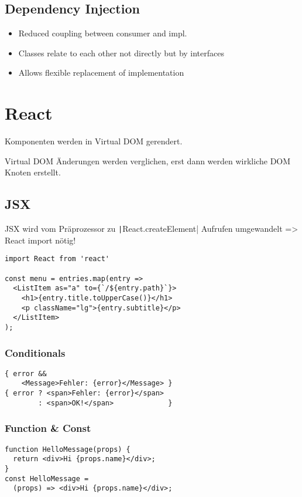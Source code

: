 \begin{multicols*}{4}
\subsection{Dependency Injection}
\begin{itemize}
    \item Reduced coupling between consumer and impl.
    \item Classes relate to each other not directly but by interfaces
    \item Allows flexible replacement of implementation
\end{itemize}

\section{React}

Komponenten werden in Virtual DOM gerendert.

Virtual DOM Änderungen werden verglichen, erst dann werden wirkliche DOM Knoten erstellt.

\subsection{JSX}
JSX wird vom Präprozessor zu \texttt|React.createElement| Aufrufen umgewandelt => React import nötig!
\begin{verbatim}
import React from 'react'

const menu = entries.map(entry =>
  <ListItem as="a" to={`/${entry.path}`}>
    <h1>{entry.title.toUpperCase()}</h1>
    <p className="lg">{entry.subtitle}</p>
  </ListItem>
);
\end{verbatim}

\subsubsection{Conditionals}
\begin{verbatim}
{ error &&
    <Message>Fehler: {error}</Message> }
{ error ? <span>Fehler: {error}</span>
        : <span>OK!</span>             }
\end{verbatim}

\subsubsection{Function \& Const}
\begin{verbatim}
function HelloMessage(props) {
  return <div>Hi {props.name}</div>;
}
const HelloMessage =
  (props) => <div>Hi {props.name}</div>;
\end{verbatim}


\end{multicols*}

